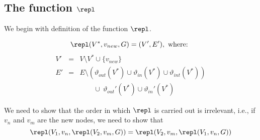 \subsection{The function $\repl$}

We begin with definition of the function $\repl$.
\vspace*{10pt}
\begin{definition}[replace]
\label{def:group-replace}

\[ \repl (V^*, v_{new}, G) = (V', E'), \mbox{ where: } \]
\begin{eqnarray*}
V' & = & V  \setminus V^*  \cup \{v_{new}\}\\
E' & = & E  \setminus (\vartheta_{out}(V^*) \cup \vartheta_{in}(V^*) \cup \vartheta_{int}(V^*))  \\
   & & \qquad \cup\  \vartheta_{out}'(V^*)  \cup \vartheta_{in}'(V^*)
\end{eqnarray*}
\end{definition}


We need to show that the order in which $\repl$ is carried out is irrelevant, i.e., if $v_n$ and $v_m$ are the new nodes, we need to show that
  \[
  \repl(V_1,v_n,\repl(V_2,v_m,G)) =   \repl(V_2,v_m,\repl(V_1,v_n,G))
  \]
  


  
  
